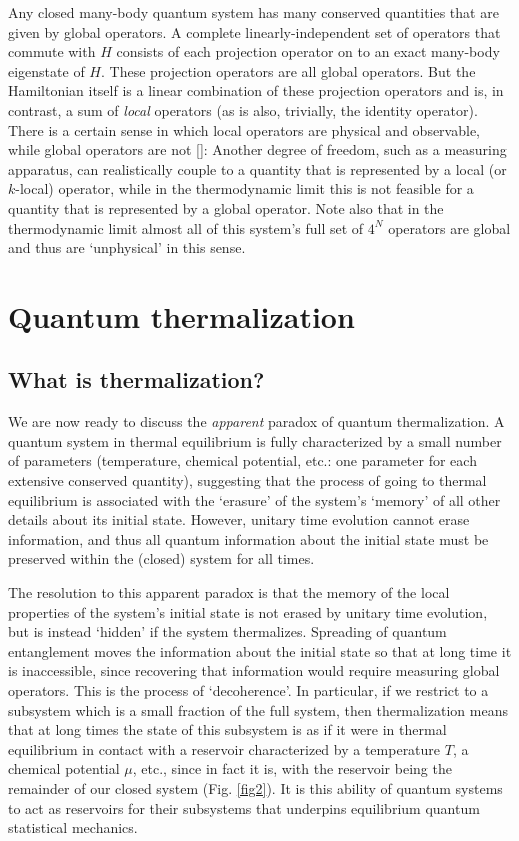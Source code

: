 \documentclass[amsmath,onecolumn, superscriptaddress,preprint,aps]{revtex4}
\renewcommand{\cite}[1]{[\onlinecite{#1}]}
\begin{document}
Any closed many-body quantum system has many conserved quantities that are given by global operators.  A complete linearly-independent set of operators that commute with $H$ consists of each projection operator on to an exact many-body eigenstate of $H$.  These projection operators are all global operators.  But the Hamiltonian itself is a linear combination of these projection operators and is, in contrast, a sum of {\it local} operators (as is also, trivially, the identity operator).  There is a certain sense in which local operators are physical and observable, while global operators are not \cite{lych}:  Another degree of freedom, such as a measuring apparatus, can realistically couple to a quantity that is represented by a local (or $k$-local) operator, while in the thermodynamic limit this is not feasible for a quantity that is represented by a global operator.  Note also that in the thermodynamic limit almost all of this system's full set of $4^N$ operators are global and thus are `unphysical' in this sense.

\section{Quantum thermalization}\label{QT}

\subsection{What is thermalization?}\label{what}

We are now ready to discuss the {\it apparent} paradox of quantum thermalization.  A quantum system in thermal equilibrium is fully characterized by a small number of parameters (temperature, chemical potential, etc.: one parameter for each extensive conserved quantity), suggesting that the process of going to thermal equilibrium is associated with the `erasure' of the system's `memory' of all other details about its initial state.  However, unitary time evolution cannot erase information, and thus all quantum information about the initial state must be preserved within the (closed) system for all times.

The resolution to this apparent paradox is that the memory of the local properties of the system's initial state is not erased by unitary time evolution,
but is instead `hidden' if the system thermalizes.  Spreading of quantum entanglement moves the information about the initial state so that at long time
it is inaccessible, since recovering that information would require measuring global operators.  This is the process of `decoherence'.
In particular, if we restrict to a subsystem which is a small fraction of the full system, then thermalization means that at long times the state of this subsystem
is as if it were in thermal equilibrium in contact with a reservoir characterized by a temperature $T$, a chemical potential $\mu$, etc., since in fact it is,
with the reservoir being the remainder of our closed system (Fig. \ref{fig2}).  It is this ability of quantum systems to act as reservoirs for their subsystems
that underpins equilibrium quantum statistical mechanics.
\end{document}
